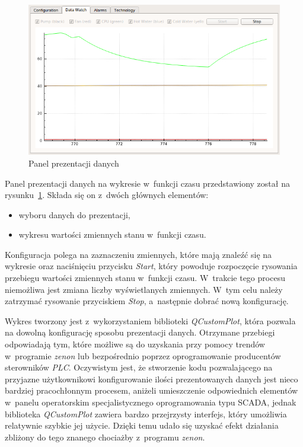 \begin{figure}[!ht]
    \centering
    \includegraphics[width=\textwidth]{../img/datawatch.png}
    \caption{Panel prezentacji danych}
    \label{fig:datawatch}
\end{figure}

Panel prezentacji danych na wykresie w~funkcji czasu przedstawiony został na
rysunku~\ref{fig:datawatch}. Składa się on z~dwóch głównych elementów:
\begin{itemize}
    \item wyboru danych do prezentacji,
    \item wykresu wartości zmiennych stanu w~funkcji czasu.
\end{itemize}

Konfiguracja polega na zaznaczeniu zmiennych, które mają znaleźć się na wykresie
oraz naciśnięciu przycisku \textit{Start}, który powoduje rozpoczęcie rysowania
przebiegu wartości zmiennych stanu w~funkcji czasu. W~trakcie tego procesu
niemożliwa jest zmiana liczby wyświetlanych zmiennych. W~tym celu należy
zatrzymać rysowanie przyciskiem \textit{Stop}, a~następnie dobrać nową
konfigurację.

Wykres tworzony jest z~wykorzystaniem biblioteki \textit{QCustomPlot}, która
pozwala na dowolną konfigurację sposobu prezentacji danych. Otrzymane przebiegi
odpowiadają tym, które możliwe są do uzyskania przy pomocy trendów w~programie
\textit{zenon} lub bezpośrednio poprzez oprogramowanie producentów sterowników
\textit{PLC}. Oczywistym jest, że stworzenie kodu pozwalającego na przyjazne
użytkownikowi konfigurowanie ilości prezentowanych danych jest nieco bardziej
pracochłonnym procesem, aniżeli umieszczenie odpowiednich elementów w~panelu
operatorskim specjalistycznego oprogramowania typu SCADA, jednak biblioteka
\textit{QCustomPlot} zawiera bardzo przejrzysty interfejs, który umożliwia
relatywnie szybkie jej użycie. Dzięki temu udało się uzyskać efekt działania
zbliżony do tego znanego chociażby z~programu \textit{zenon}.

